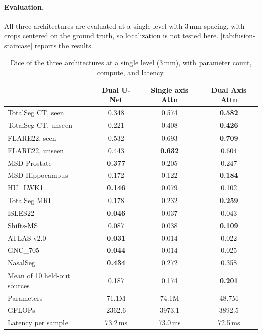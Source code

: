 \paragraph{Evaluation.}
All three architectures are evaluated at a single level with 3\,mm spacing,
with crops centered on the ground truth, so localization is not tested here.
\autoref{tab:fusion-staircase} reports the results.


\begin{table}[t]
  \centering
  \small
  \caption{Dice of the three architectures at a single level (3\,mm), with
  parameter count, compute, and latency.}
  \label{tab:fusion-staircase}
  \begin{tabular}{@{}lccc@{}}
    \toprule
    & Dual U-Net & Single axis Attn & Dual Axis Attn \\
    \midrule
    TotalSeg CT, seen      & 0.348 & 0.574 & \textbf{0.582} \\
    TotalSeg CT, unseen    & 0.221 & 0.408 & \textbf{0.426} \\
    FLARE22, seen          & 0.532 & 0.693 & \textbf{0.709} \\
    FLARE22, unseen        & 0.443 & \textbf{0.632} & 0.604 \\
    \midrule
    MSD Prostate           & \textbf{0.377} & 0.205 & 0.247 \\
    MSD Hippocampus        & 0.172 & 0.122 & \textbf{0.184} \\
    \midrule
    HU\_LWK1               & \textbf{0.146} & 0.079 & 0.102 \\
    \midrule
    TotalSeg MRI           & 0.178 & 0.232 & \textbf{0.259} \\
    \midrule
    ISLES22                & \textbf{0.046} & 0.037 & 0.043 \\
    Shifts-MS               & 0.087 & 0.038 & \textbf{0.109} \\
    ATLAS v2.0              & \textbf{0.031} & 0.014 & 0.022 \\
    GNC\_705                & \textbf{0.044} & 0.014 & 0.025 \\
    NasalSeg                & \textbf{0.434} & 0.272 & 0.358 \\
    \midrule
    Mean of 10 held-out sources & 0.187 & 0.174 & \textbf{0.201} \\
    \midrule
    Parameters             & 71.1M  & 74.1M  & 48.7M  \\
    GFLOPs                 & 2362.6 & 3973.1 & 3892.5 \\
    Latency per sample     & 73.2\,ms & 73.0\,ms & 72.5\,ms \\
    \bottomrule
  \end{tabular}

\end{table}

